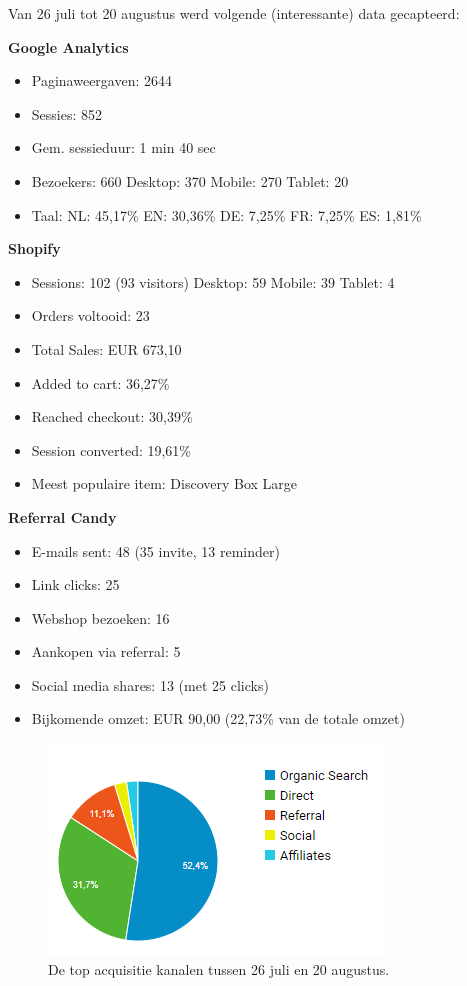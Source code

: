 Van 26 juli tot 20 augustus werd volgende (interessante) data gecapteerd:

\textbf{Google Analytics}
\begin{itemize}
	\item Paginaweergaven: 2644	
	\item Sessies: 852
	\item Gem. sessieduur: 1 min 40 sec
	\item Bezoekers: 660
		\subitem Desktop: 370
		\subitem Mobile: 270
		\subitem Tablet: 20
	\item Taal:
		\subitem NL: 45,17\%
		\subitem EN: 30,36\%
		\subitem DE: 7,25\%
		\subitem FR: 7,25\%
		\subitem ES: 1,81\%
\end{itemize}
\textbf{Shopify}
\begin{itemize}
	\item Sessions: 102 (93 visitors)
		\subitem Desktop: 59
		\subitem Mobile: 39
		\subitem Tablet: 4
	\item Orders voltooid: 23
	\item Total Sales: EUR 673,10
	\item Added to cart: 36,27\%
	\item Reached checkout: 30,39\%
	\item Session converted: 19,61\%
	\item Meest populaire item: Discovery Box Large
\end{itemize}
\textbf{Referral Candy}
\begin{itemize}
	\item E-mails sent: 48 (35 invite, 13 reminder)
	\item Link clicks: 25
	\item Webshop bezoeken: 16
	\item Aankopen via referral: 5
	\item Social media shares: 13 (met 25 clicks)
	\item Bijkomende omzet: EUR 90,00 (22,73\% van de totale omzet)
\end{itemize}

\begin{figure}
	\includegraphics[]{img/acquisitie-kanalen.png}
	\centering
	\caption{De top acquisitie kanalen tussen 26 juli en 20 augustus.}
	\label{fig:acquisitie-kanalen}
\end{figure}

